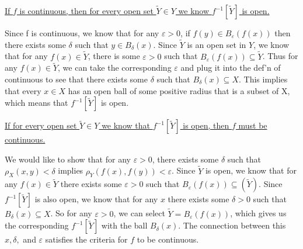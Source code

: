 \documentclass[]{article}
\begin{document}
		

		\underline{If $f$ is continuous, then for every open set $\tilde{Y} \in Y$ we know $f^{-1}[\tilde{Y}]$ is open.}

		Since f is continuous, we know that for any $\varepsilon > 0$, if $f(y) \in B_\varepsilon(f(x))$ then there exists some $\delta$ such that $y \in B_\delta(x)$. Since $\tilde{Y}$ is an open set in $Y$, we know that for any $f(x) \in \tilde{Y}$, there is some $\varepsilon > 0$ such that $B_\varepsilon(f(x)) \subseteq \tilde{Y}$. Thus for any $f(x) \in \tilde{Y}$, we can take the corresponding $\varepsilon$ and plug it into the def'n of continuous to see that there exists some $\delta$ such that $B_\delta(x) \subseteq X$. This implies that every $x \in X$ has an open ball of some positive radius  that is a subset of X, which means that $f^{-1}[\tilde{Y}]$ is open.



		\underline{If for every open set $\tilde{Y} \in Y$ we know that $f^{-1}[\tilde{Y}]$ is open, then $f$ must be continuous.}

		We would like to show that for any $\varepsilon > 0$, there exists some $\delta$ such that $\rho_X(x, y) < \delta$ implies $\rho_Y(f(x), f(y)) < \varepsilon$. Since $\tilde{Y}$ is open, we know that for any $f(x) \in \tilde{Y}$ there exists some $\varepsilon > 0$ such that $B_\varepsilon(f(x)) \subseteq(\tilde{Y})$. Since $f^{-1}[\tilde{Y}]$ is also open, we know that for any $x$ there exists some $\delta > 0$ such that $B_\delta(x) \subseteq X$. So for any $\varepsilon > 0$, we can select $\tilde{Y} = B_\varepsilon(f(x))$, which gives us the corresponding $f^{-1}[\tilde{Y}]$ with the ball $B_\delta(x)$. The connection between this $x, \delta,$ and $\varepsilon$ satisfies the criteria for $f$ to be continuous. 
\end{document}

